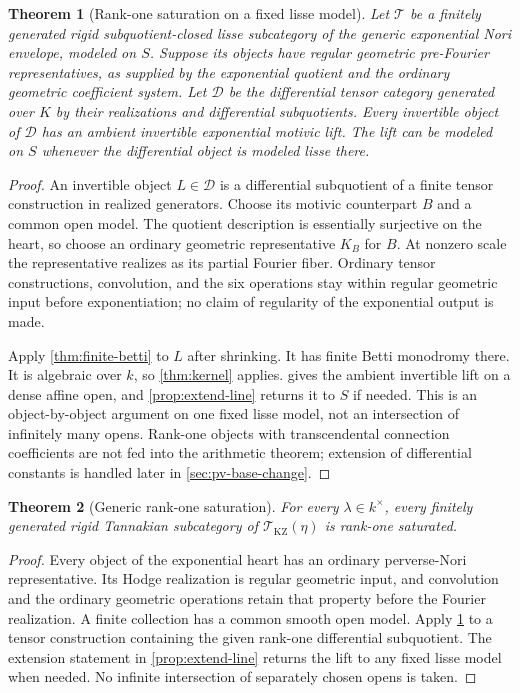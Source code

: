 \documentclass[11pt]{article}
\numberwithin{equation}{section}
\newtheorem{theorem}{Theorem}[section]
\theoremstyle{definition}
\theoremstyle{remark}
\newcommand{\Tcal}{\mathcal T}
\newcommand{\Dcal}{\mathcal D}
\begin{document}
\begin{theorem}[Rank-one saturation on a fixed lisse model]\label{thm:saturation}
Let $\Tcal$ be a finitely generated rigid subquotient-closed lisse
subcategory of the generic exponential Nori envelope, modeled on $S$.
Suppose its objects have regular geometric pre-Fourier representatives,
as supplied by the exponential quotient and the ordinary geometric
coefficient system. Let $\Dcal$ be the differential tensor category
generated over $K$ by their realizations and differential subquotients.
Every invertible object of $\Dcal$ has an ambient invertible exponential
motivic lift. The lift can be modeled on $S$ whenever the differential
object is modeled lisse there.
\end{theorem}
\begin{proof}
An invertible object $L\in\Dcal$ is a differential subquotient of a
finite tensor construction in realized generators. Choose its motivic
counterpart $B$ and a common open model. The quotient description is
essentially surjective on the heart, so choose an ordinary geometric
representative $K_B$ for $B$. At nonzero scale the representative realizes
as its partial Fourier fiber. Ordinary tensor constructions, convolution,
and the six operations stay within regular geometric input before
exponentiation; no claim of regularity of the exponential output is made.

Apply \cref{thm:finite-betti} to $L$ after shrinking. It has finite
Betti monodromy there. It is algebraic over $k$, so \cref{thm:kernel}
applies.  gives the ambient invertible lift on a
dense affine open, and \cref{prop:extend-line} returns it to $S$ if needed.
This is an object-by-object argument on one fixed lisse model, not an
intersection of infinitely many opens. Rank-one objects with transcendental
connection coefficients are not fed into the arithmetic theorem; extension
of differential constants is handled later in \cref{sec:pv-base-change}.
\end{proof}

\begin{theorem}[Generic rank-one saturation]\label{thm:global-RS}
For every $\lambda\in k^\times$, every finitely generated rigid Tannakian
subcategory of $\Tcal_{\mathrm{KZ}}(\eta)$ is rank-one saturated.
\end{theorem}
\begin{proof}
Every object of the exponential heart has an ordinary perverse-Nori
representative. Its Hodge realization is regular geometric input, and
convolution and the ordinary geometric operations retain that property
before the Fourier realization. A finite collection has a common smooth
open model. Apply \cref{thm:saturation} to a tensor construction containing
the given rank-one differential subquotient. The extension statement in
\cref{prop:extend-line} returns the lift to any fixed lisse model when
needed. No infinite intersection of separately chosen opens is taken.
\end{proof}
\end{document}
